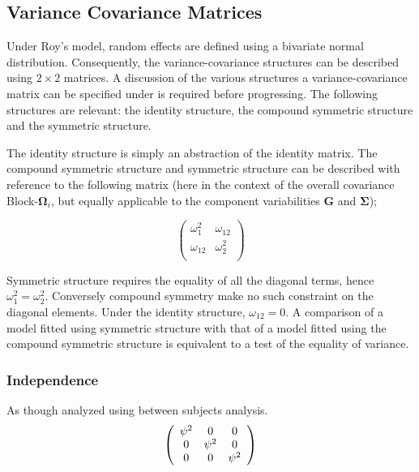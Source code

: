 \documentclass[12pt, a4paper]{report}
\theoremstyle{plain}
\theoremstyle{definition}
\theoremstyle{remark}
\begin{document}
	
	







	\subsection{Variance Covariance Matrices }
	
	Under Roy's model, random effects are defined using a bivariate normal distribution. Consequently, the variance-covariance structures can be described using $2 \times 2$  matrices. A discussion of the various structures a variance-covariance matrix can be specified under is required before progressing. The following structures are relevant: the identity structure, the compound symmetric structure and the symmetric structure.
	
	The identity structure is simply an abstraction of the identity matrix. The compound symmetric structure and symmetric structure can be described with reference to the following matrix (here in the context of the overall covariance Block-$\boldsymbol{\Omega}_i$, but equally applicable to the component variabilities $\boldsymbol{G}$ and $\boldsymbol{\Sigma}$);
	
	\[\left( \begin{array}{cc}
	\omega^2_1  & \omega_{12} \\
	\omega_{12} & \omega^2_2 \\
	\end{array}\right) \]
	
	Symmetric structure requires the equality of all the diagonal terms, hence $\omega^2_1 = \omega^2_2$. Conversely compound symmetry make no such constraint on the diagonal elements. Under the identity structure, $\omega_{12} = 0$.
	A comparison of a model fitted using symmetric structure with that of a model fitted using the compound symmetric structure is equivalent to a test of the equality of variance.
	
	
	
	\subsubsection*{Independence}
	
	As though analyzed using between subjects analysis.
	\[
	\left(
	\begin{array}{c c c}
	\psi^2 & 0 & 0   \\
	0 & \psi^2 & 0   \\
	0 & 0 & \psi^2   \\
	\end{array}%
	\right)
	\]	
	
\end{document}
